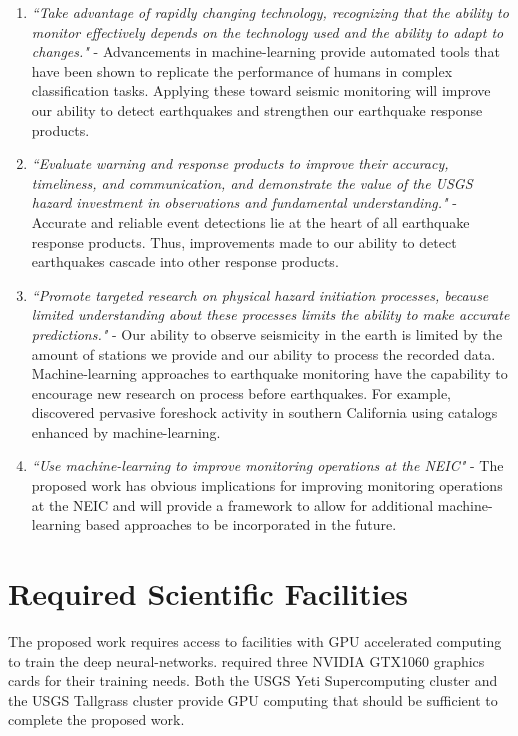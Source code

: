 \documentclass[12p]{article}
\begin{document}
\begin{enumerate}
  \item \emph{``Take advantage of rapidly changing technology, recognizing that the ability to monitor effectively depends on the technology used and the ability to adapt to changes."} - Advancements in machine-learning provide automated tools that have been shown to replicate the performance of humans in complex classification tasks. Applying these toward seismic monitoring will improve our ability to detect earthquakes and strengthen our earthquake response products.

  \item \emph{``Evaluate warning and response products to improve their accuracy, timeliness, and communication, and demonstrate the value of the USGS hazard investment in observations and fundamental understanding."} - Accurate and reliable event detections lie at the heart of all earthquake response products. Thus, improvements made to our ability to detect earthquakes cascade into other response products.

  \item \emph{``Promote targeted research on physical hazard initiation processes, because limited understanding about these processes limits the ability to make accurate predictions."} - Our ability to observe seismicity in the earth is limited by the amount of stations we provide and our ability to process the recorded data. Machine-learning approaches to earthquake monitoring have the capability to encourage new research on process before earthquakes. For example, \citet{Trugman2019} discovered pervasive foreshock activity in southern California using catalogs enhanced by machine-learning.

  \item \emph{``Use machine-learning to improve monitoring operations at the NEIC"} - The proposed work has obvious implications for improving monitoring operations at the NEIC and will provide a framework to allow for additional machine-learning based approaches to be incorporated in the future.

\end{enumerate}

\section*{Required Scientific Facilities}
The proposed work requires access to facilities with GPU accelerated computing to train the deep neural-networks. \citet{Ross2018b} required three NVIDIA GTX1060 graphics cards for their training needs. Both the USGS Yeti Supercomputing cluster and the USGS Tallgrass cluster provide GPU computing that should be sufficient to complete the proposed work.



\end{document}
